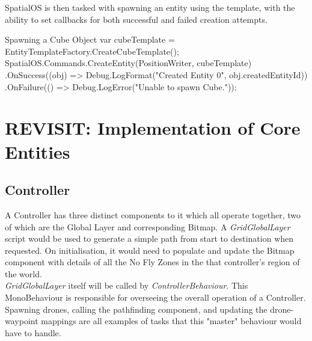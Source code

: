 \documentclass[a4paper,12pt,titlepage]{article}
\begin{document}
SpatialOS is then tasked with spawning an entity using the template, with the ability to set callbacks for both successful and failed creation attempts.\\

\begin{sexylisting}[colback=white]{Spawning a Cube Object}
var cubeTemplate = EntityTemplateFactory.CreateCubeTemplate();
SpatialOS.Commands.CreateEntity(PositionWriter, cubeTemplate)
  .OnSuccess((obj) =>
    Debug.LogFormat("Created Entity {0}", obj.createdEntityId))
  .OnFailure(() => Debug.LogError("Unable to spawn Cube."));
\end{sexylisting}

\newpage
\section{REVISIT: Implementation of Core Entities}
\subsection{Controller}
A Controller has three distinct components to it which all operate together, two of which are the Global Layer and corresponding Bitmap. A \textit{GridGlobalLayer} script would be used to generate a simple path from start to destination when requested. On initialisation, it would need to populate and update the Bitmap component with details of all the No Fly Zones in the that controller's region of the world.\\

\textit{GridGlobalLayer} itself will be called by \textit{ControllerBehaviour}. This MonoBehaviour is responsible for overseeing the overall operation of a Controller. Spawning drones, calling the pathfinding component, and updating the drone-waypoint mappings are all examples of tasks that this "master" behaviour would have to handle.
\end{document}
